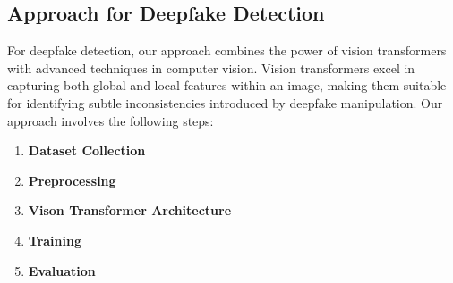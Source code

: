 \subsection{Approach for Deepfake Detection}

For deepfake detection, our approach combines the power of vision transformers with advanced techniques in computer vision. Vision transformers excel in capturing both global and local features within an image, making them suitable for identifying subtle inconsistencies introduced by deepfake manipulation.
\newpage
Our approach involves the following steps:
\vspace{0.2cm}
\begin{enumerate}
    \item \textbf{Dataset Collection}
    \item \textbf{Preprocessing}
    \item \textbf{Vison Transformer Architecture}
    \item \textbf{Training}
    \item \textbf{Evaluation}

\end{enumerate}





